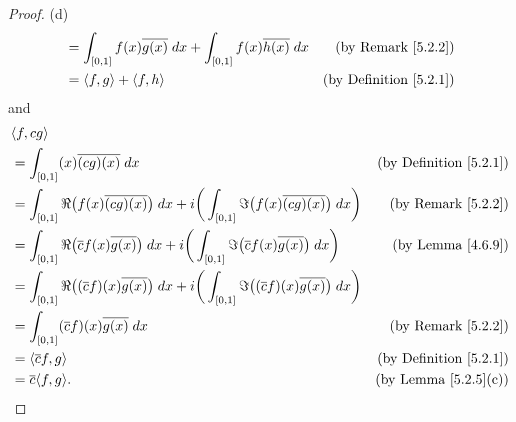 \begin{proof}{(d)}
\begin{align*}
         & = \int_{[0, 1]} f(x) \overline{g(x)} \; dx + \int_{[0, 1]} f(x) \overline{h(x)} \; dx                                               & \text{(by Remark \ref{5.2.2})}                                               \\
         & = \inner*{f, g} + \inner*{f, h}                                                                                                     & \text{(by Definition \ref{5.2.1})}
    \end{align*}
    and
    \begin{align*}
         & \inner*{f, cg}                                                                                                                                                                                   \\
         & = \int_{[0, 1]} (x) \overline{(cg)(x)} \; dx                                                                                                                & \text{(by Definition \ref{5.2.1})} \\
         & = \int_{[0, 1]} \Re\big(f(x) \overline{(cg)(x)}\big) \; dx + i \bigg(\int_{[0, 1]} \Im\big(f(x) \overline{(cg)(x)}\big) \; dx\bigg)                         & \text{(by Remark \ref{5.2.2})}     \\
         & = \int_{[0, 1]} \Re\big(\overline{c} f(x) \overline{g(x)}\big) \; dx + i \bigg(\int_{[0, 1]} \Im\big(\overline{c} f(x) \overline{g(x)}\big) \; dx\bigg)     & \text{(by Lemma \ref{4.6.9})}      \\
         & = \int_{[0, 1]} \Re\big((\overline{c} f)(x) \overline{g(x)}\big) \; dx + i \bigg(\int_{[0, 1]} \Im\big((\overline{c} f)(x) \overline{g(x)}\big) \; dx\bigg)                                      \\
         & = \int_{[0, 1]} (\overline{c} f)(x) \overline{g(x)} \; dx                                                                                                   & \text{(by Remark \ref{5.2.2})}     \\
         & = \inner*{\overline{c} f, g}                                                                                                                                & \text{(by Definition \ref{5.2.1})} \\
         & = \overline{c} \inner*{f, g}.                                                                                                                               & \text{(by Lemma \ref{5.2.5}(c))}
    \end{align*}
\end{proof}

